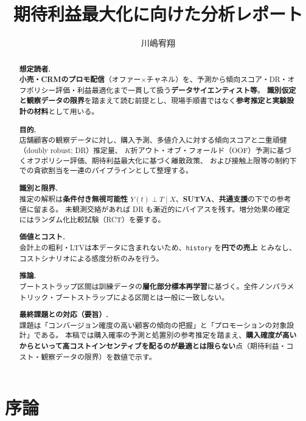 \documentclass[11pt,a4paper]{article}
\title{期待利益最大化に向けた分析レポート}
\author{川嶋宥翔\\[0.4em]\small }
\begin{document}
\maketitle

\begin{abstract}
\noindent
\textbf{想定読者.}\\
\textbf{小売・CRMのプロモ配信}（オファー$\times$チャネル）を、予測から傾向スコア・DR・オフポリシー評価・利益最適化まで一貫して扱う\textbf{データサイエンティスト等}。
\textbf{識別仮定と観察データの限界}を踏まえて読む前提とし、現場手順書ではなく\textbf{参考推定と実験設計の材料}として用いる。

\medskip\noindent
\textbf{目的.}\\
店舗顧客の観察データに対し、購入予測、多値介入に対する傾向スコアと二重頑健（doubly robust; DR）推定量、
$K$折アウト・オブ・フォールド（OOF）予測に基づくオフポリシー評価、期待利益最大化に基づく離散政策、
および接触上限等の制約下での貪欲割当を一連のパイプラインとして整理する。

\medskip\noindent
\textbf{識別と限界.}\\
推定の解釈は\textbf{条件付き無視可能性} $Y(t)\perp T \mid X$、\textbf{SUTVA}、\textbf{共通支援}の下での参考値に留まる。
未観測交絡があれば DR も漸近的にバイアスを残す。増分効果の確定にはランダム化比較試験（RCT）を要する。

\medskip\noindent
\textbf{価値とコスト.}\\
会計上の粗利・LTVは本データに含まれないため、\texttt{history} を\textbf{円での売上} とみなし、コストシナリオによる感度分析のみを行う。

\medskip\noindent
\textbf{推論.}\\
ブートストラップ区間は訓練データの\textbf{層化部分標本再学習}に基づく。全件ノンパラメトリック・ブートストラップによる区間とは一般に一致しない。

\medskip\noindent
\textbf{最終課題との対応（要旨）.}\\
課題は「コンバージョン確度の高い顧客の傾向の把握」と「プロモーションの対象設計」である。
本稿では購入確率の予測と処置別の参考推定を踏まえ、\textbf{購入確度が高いからといって高コストインセンティブを配るのが最適とは限らない}点（期待利益・コスト・観察データの限界）を数値で示す。
\end{abstract}

\newpage
\tableofcontents
\newpage

\section{序論}
\end{document}

